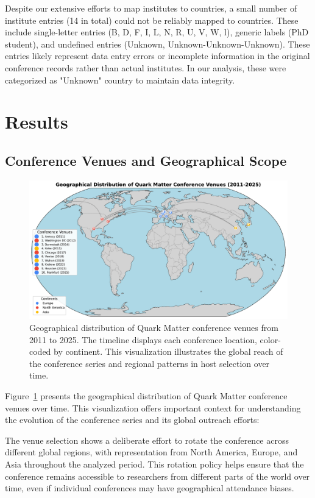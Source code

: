 \documentclass[a4paper,11pt]{article}
\begin{document}
Despite our extensive efforts to map institutes to countries, a small number of institute entries (14 in total) could not be reliably mapped to countries. These include single-letter entries (B, D, F, I, L, N, R, U, V, W, l), generic labels (PhD student), and undefined entries (Unknown, Unknown-Unknown-Unknown). These entries likely represent data entry errors or incomplete information in the original conference records rather than actual institutes. In our analysis, these were categorized as "Unknown" country to maintain data integrity.

\section{Results}

\subsection{Conference Venues and Geographical Scope}

\begin{figure}[H]
\centering
\includegraphics[width=\textwidth]{figures/conference_venues.pdf}
\caption{Geographical distribution of Quark Matter conference venues from 2011 to 2025. The timeline displays each conference location, color-coded by continent. This visualization illustrates the global reach of the conference series and regional patterns in host selection over time.}
\label{fig:venues}
\end{figure}

Figure~\ref{fig:venues} presents the geographical distribution of Quark Matter conference venues over time. This visualization offers important context for understanding the evolution of the conference series and its global outreach efforts:

The venue selection shows a deliberate effort to rotate the conference across different global regions, with representation from North America, Europe, and Asia throughout the analyzed period. This rotation policy helps ensure that the conference remains accessible to researchers from different parts of the world over time, even if individual conferences may have geographical attendance biases.
\end{document}
